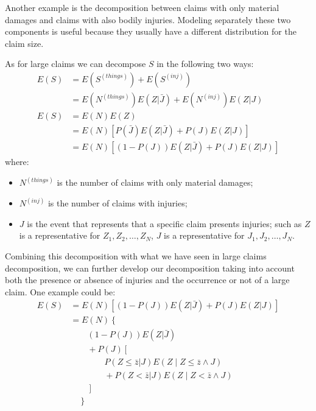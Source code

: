 \documentclass[a4paper, nobind]{templates/ociamthesis}
\providecommand{\tightlist}{%
  \setlength{\itemsep}{0pt}\setlength{\parskip}{0pt}}
\theoremstyle{definition}
\theoremstyle{definition}
\theoremstyle{definition}
\theoremstyle{remark}
\begin{document}
Another example is the decomposition between claims with only material damages and claims with also bodily injuries. Modeling separately these two components is useful because they usually have a different distribution for the claim size.

As for large claims we can decompose \(S\) in the following two ways:
\begin{align}
  \nonumber
  E(S) & = E(S^{(things)}) + E(S^{(inj)}) \\
    \label{inj-claim-decomposition-expected-1}
    & = E(N^{(things)}) E(Z|\bar{J}) + E(N^{(inj)}) E(Z|J) \\[12pt]
  \nonumber
  E(S) & = E(N) E(Z) \\
    \nonumber
    & = E(N) \left[P(\bar{J}) E(Z|\bar{J}) + P(J) E(Z|J) \right] \\
    \label{inj-claim-decomposition-expected-2}
    & = E(N) \left[\left( 1 - P(J) \right) E(Z|\bar{J}) + P(J) E(Z|J)\right]
\end{align}
where:

\begin{itemize}
\tightlist
\item
  \(N^{(things)}\) is the number of claims with only material damages;
\item
  \(N^{(inj)}\) is the number of claims with injuries;
\item
  \(J\) is the event that represents that a specific claim presents injuries; such as \(Z\) is a representative for \(Z_1, Z_2, \dots, Z_N\), \(J\) is a representative for \(J_1, J_2, \dots, J_N\).
\end{itemize}

Combining this decomposition with what we have seen in large claims decomposition, we can further develop our decomposition taking into account both the presence or absence of injuries and the occurrence or not of a large claim. One example could be:
\begin{align*}
E(S) & = E(N) \left[\left( 1 - P(J) \right) E(Z|\bar{J}) + P(J) E(Z|J) \right] \\[4pt]
  & = E(N) \left\{ \right. \\
  & \qquad \left( 1 - P(J) \right) E(Z|\bar{J}) \\
  & \qquad + P(J) \left[ \right. \\
  & \qquad \qquad P(Z \le \bar{z} | J) E\left( Z \mid Z\le \bar{z} \land J \right) \\
  & \qquad \qquad + P(Z < \bar{z} | J) E\left( Z \mid Z < \bar{z} \land J \right) \\
  & \qquad \left. \right] \\
  & \quad \left. \right\}
\end{align*}
\end{document}
